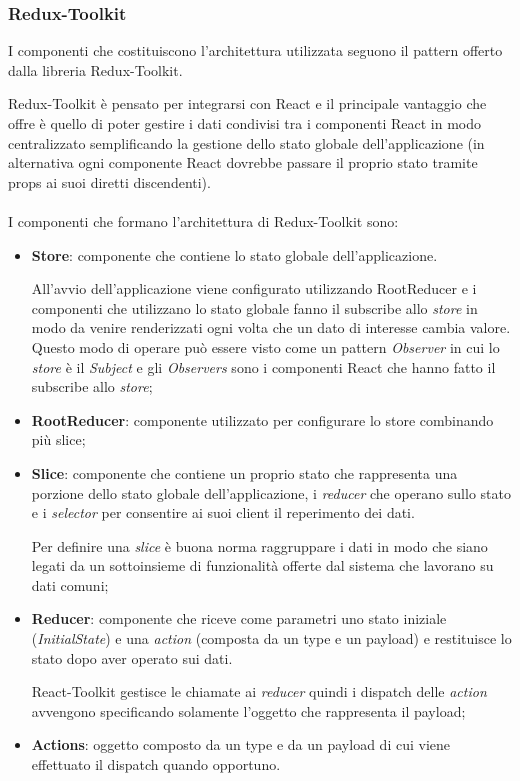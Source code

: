 \subsubsection{Redux-Toolkit}
I componenti che costituiscono l'architettura utilizzata seguono il pattern offerto dalla libreria Redux-Toolkit.

Redux-Toolkit è pensato per integrarsi con React e il principale vantaggio che offre è quello di poter gestire i dati condivisi tra 
i componenti React in modo centralizzato semplificando la gestione dello stato globale dell'applicazione 
(in alternativa ogni componente React dovrebbe passare il proprio stato tramite props ai suoi diretti discendenti).
\\\\
I componenti che formano l'architettura di Redux-Toolkit sono:
\begin{itemize}
	\item \textbf{Store}: componente che contiene lo stato globale dell'applicazione.
	
	All'avvio dell'applicazione viene configurato utilizzando RootReducer e i componenti che utilizzano lo stato globale fanno il subscribe allo \textit{store}
	in modo da venire renderizzati ogni volta che un dato di interesse cambia valore.
	Questo modo di operare può essere visto come un pattern \textit{Observer} in cui lo \textit{store} è il \textit{Subject} e gli \textit{Observers} sono i componenti React che hanno fatto 
	il subscribe allo \textit{store};
	\item \textbf{RootReducer}: componente utilizzato per configurare lo store combinando più slice;
	\item \textbf{Slice}: componente che contiene un proprio stato che rappresenta una porzione dello stato globale dell'applicazione, i \textit{reducer}
	che operano sullo stato e i \textit{selector} per consentire ai suoi client il reperimento dei dati. 

	Per definire una \textit{slice} è buona norma raggruppare i dati in modo che siano legati da un sottoinsieme di funzionalità offerte dal sistema che lavorano 
	su dati comuni;  
	\item \textbf{Reducer}: componente che riceve come parametri uno stato iniziale (\textit{InitialState}) e una \textit{action} (composta da un type e un payload) e restituisce 
	lo stato dopo aver operato sui dati. 
	
	React-Toolkit gestisce le chiamate ai \textit{reducer} quindi i dispatch delle \textit{action} avvengono
	specificando solamente l'oggetto che rappresenta il payload; 
	\item \textbf{Actions}: oggetto composto da un type e da un payload di cui viene effettuato il dispatch quando opportuno. 
	

\end{itemize}

